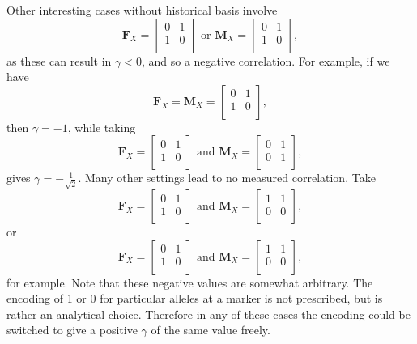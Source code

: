 \documentclass[sts]{imsart}
\newcommand{\m}[1]{\mathbf{#1}}               %
\begin{document}
Other interesting cases without historical basis involve
$$\m{F}_X = \begin{bmatrix}
  0 & 1 \\
  1 & 0 \\
\end{bmatrix} \text{ or } \m{M}_X = \begin{bmatrix}
  0 & 1 \\
  1 & 0 \\
\end{bmatrix},$$
as these can result in $\gamma < 0$, and so a negative correlation. For example, if we have
$$\m{F}_X = \m{M}_X = \begin{bmatrix}
  0 & 1 \\
  1 & 0 \\
\end{bmatrix},$$
then $\gamma = -1$, while taking
$$\m{F}_X = \begin{bmatrix}
  0 & 1 \\
  1 & 0 \\
\end{bmatrix} \text{ and } \m{M}_X = \begin{bmatrix}
  0 & 1 \\
  0 & 1 \\
\end{bmatrix},$$
gives $\gamma = -\frac{1}{\sqrt{2}}$. Many other settings lead to no measured correlation. Take
$$\m{F}_X = \begin{bmatrix}
  0 & 1 \\
  1 & 0 \\
\end{bmatrix} \text{ and } \m{M}_X = \begin{bmatrix}
  1 & 1 \\
  0 & 0 \\
\end{bmatrix},$$
or
$$\m{F}_X = \begin{bmatrix}
  0 & 1 \\
  1 & 0 \\
\end{bmatrix} \text{ and } \m{M}_X = \begin{bmatrix}
  1 & 1 \\
  0 & 0 \\
\end{bmatrix},$$
for example. Note that these negative values are somewhat arbitrary. The encoding of 1 or 0 for particular alleles at a marker is not prescribed, but is rather an analytical choice. Therefore in any of these cases the encoding could be switched to give a positive $\gamma$ of the same value freely. 
\end{document}
